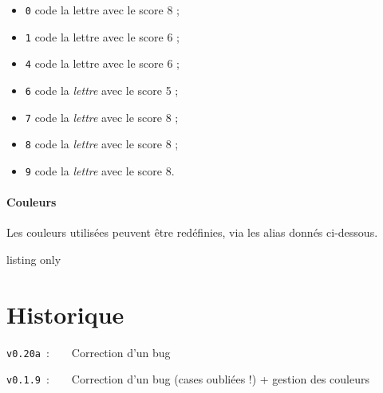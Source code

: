 \documentclass{article}
\begin{document}
\begin{itemize}
	\item \texttt{0} code la lettre  avec le score 8 ;
	\item \texttt{1} code la lettre  avec le score 6 ;
	\item \texttt{4} code la lettre  avec le score 6 ;
	\item \texttt{6} code la \textit{lettre}  avec le score 5 ;
	\item \texttt{7} code la \textit{lettre}  avec le score 8 ;
	\item \texttt{8} code la \textit{lettre}  avec le score 8 ;
	\item \texttt{9} code la \textit{lettre}  avec le score 8.
\end{itemize}

\begin{PresentationCode}{}
{\Huge {}}

{\Huge {}}
\end{PresentationCode}

\subsection{Couleurs}

Les couleurs utilisées peuvent être redéfinies, via les alias donnés ci-dessous.

\begin{PresentationCode}{listing only}
\end{PresentationCode}

\newpage

\part*{Historique}

\verb|v0.20a|~:~~~~Correction d'un bug

\verb|v0.1.9|~:~~~~Correction d'un bug (cases oubliées !) + gestion des couleurs
\end{document}
